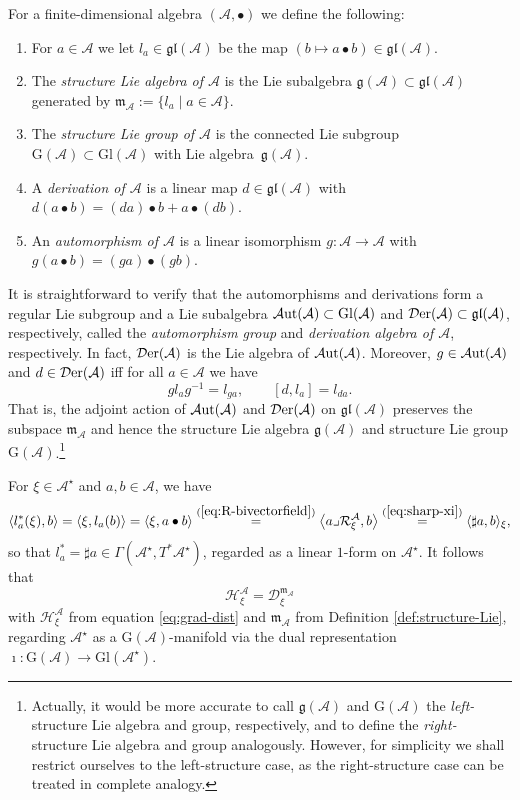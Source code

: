 \documentclass[pdftex]{sigma}
\numberwithin{equation}{section}
\newcommand{\be}{\begin{equation}}
\newcommand{\ee}{\end{equation}}
\newcommand{\hh}{\mathcal{H}}
\newcommand{\Aut}{\mathcal{A}{\rm ut}}
\newcommand{\Der}{\mathcal{D}{\rm er}}
\newcommand{\dcal}{\mathcal{D}}
\newcommand{\m}{\mathfrak{m}}
\newcommand{\G}{\mathrm{G}}
\newcommand{\Gl}{{\mathrm{Gl}}}
\newcommand{\g}{{\mathfrak{g}}}
\renewcommand{\m}{{\mathfrak m}}
\newcommand{\gl}{{\mathfrak{gl}}}
\newcommand{\cR}{\mathcal{R}}
\newcommand{\cA}{\mathcal{A}}
\begin{document}
\begin{Definition} \label{def:structure-Lie} For a finite-dimensional algebra $(\cA, \bullet)$ we define the following:
\begin{enumerate}\itemsep=0pt
\item[(1)]
For $a \in \cA$ we let $l_a \in \gl(\cA)$ be the map $(b \mapsto a \bullet b) \in \gl(\cA)$.
\item[(2)]
The {\em structure Lie algebra of $\cA$ }is the Lie subalgebra $\g(\cA) \subset \gl(\cA)$ generated by $\m_\cA := \{l_a \mid a \in \cA\}$.
\item[(3)]
The {\em structure Lie group of $\cA$ }is the connected Lie subgroup $\G(\cA) \subset \Gl(\cA)$ with Lie algebra~$\g(\cA)$.
\item[(4)]
A {\em derivation of $\cA$ }is a linear map $d \in \gl(\cA)$ with $d(a \bullet b) = (da) \bullet b + a \bullet (db)$.
\item[(5)]
An {\em automorphism of $\cA$ }is a linear isomorphism $g\colon \cA \to \cA$ with $g(a \bullet b) = (ga) \bullet (gb)$.
\end{enumerate}
\end{Definition}

It is straightforward to verify that the automorphisms and derivations form a regular Lie subgroup and a Lie subalgebra $\Aut(\cA) \subset \Gl(\cA)$ and $\Der(\cA) \subset \gl(\cA)$, respectively, called the {\em automorphism group }and {\em derivation algebra of $\cA$}, respectively. In fact, $\Der(\cA)$ is the Lie algebra of $\Aut(\cA)$. Moreover, $g \in \Aut(\cA)$ and $d \in \Der(\cA)$ iff for all $a \in \cA$ we have
\be \label{eq:der-leftaction}
g l_a g^{-1} = l_{ga}, \qquad [d, l_a] = l_{da}.
\ee
That is, the adjoint action of $\Aut(\cA)$ and $\Der(\cA)$ on $\gl(\cA)$ preserves the subspace $\m_\cA$ and hence the structure Lie algebra $\g(\cA)$ and structure Lie group $\G(\cA)$.\footnote{Actually, it would be more accurate to call $\g(\cA)$ and $\G(\cA)$ the {\em left-}structure Lie algebra and group, respectively, and to define the {\em right-}structure Lie algebra and group analogously. However, for simplicity we shall restrict ourselves to the left-structure case, as the right-structure case can be treated in complete analogy.}

For $\xi \in \cA^\star$ and $a,b \in \cA$, we have
\[
\langle l_a^\ast(\xi), b \rangle = \langle \xi, l_a(b)\rangle = \langle \xi, a \bullet b\rangle \stackrel{(\ref{eq:R-bivectorfield})}= \big\langle a \lrcorner \cR^\cA_\xi, b\big\rangle \stackrel{(\ref{eq:sharp-xi})}= \langle \sharp a, b
\rangle_\xi,
\]
so that $l_a^\ast = \sharp a \in \Gamma(\cA^\star, T^\ast \cA^\star)$, regarded as a linear $1$-form on $\cA^\star$. It follows that
\be \label{eq:grad=dist}
\hh^\cA_\xi = \dcal^{\m_\cA}_\xi
\ee
with $\hh^\cA_\xi$ from equation \eqref{eq:grad-dist} and $\m_\cA$ from Definition \ref{def:structure-Lie}, regarding $\cA^\star$ as a $\G(\cA)$-manifold via the dual representation $\imath\colon \G(\cA) \to \Gl(\cA^\star)$.
\end{document}
